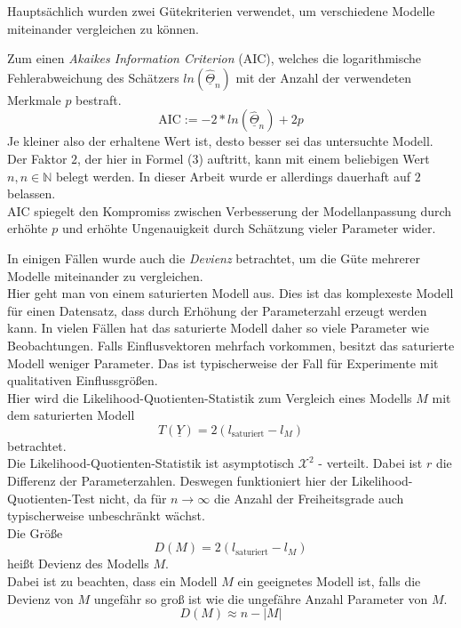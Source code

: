 \noindent
Haupts\"achlich wurden zwei G\"utekriterien verwendet, um verschiedene Modelle miteinander vergleichen zu k\"onnen.
\par\smallskip
Zum einen \textit{Akaikes Information Criterion} (AIC), welches die logarithmische Fehlerabweichung des Sch\"atzers $ln(\underline{\hat{\Theta}}_n)$ mit der Anzahl der verwendeten Merkmale $p$ bestraft. \\
\begin{equation}
\text{AIC} := -2*ln(\underline{\hat{\Theta}}_n) + 2p
\label{eq:aic}
\end{equation}  
Je kleiner also der erhaltene Wert ist, desto besser sei das untersuchte Modell. \\
Der Faktor $2$, der hier in Formel (3) auftritt, kann mit einem beliebigen Wert $n, n\in \mathds{N}$ belegt werden. In dieser Arbeit wurde er allerdings dauerhaft auf $2$ belassen. \\ 
AIC spiegelt den Kompromiss zwischen Verbesserung der Modellanpassung durch erh\"ohte $p$ und erh\"ohte Ungenauigkeit durch Sch\"atzung vieler Parameter wider.
\par\smallskip
In einigen F\"allen wurde auch die \textit{Devienz} betrachtet, um die G\"ute mehrerer Modelle miteinander zu vergleichen. \\
Hier geht man von einem saturierten Modell aus. Dies ist das komplexeste Modell f\"ur einen Datensatz, dass durch Erh\"ohung der Parameterzahl erzeugt werden kann. In vielen F\"allen hat das saturierte Modell daher so viele Parameter wie Beobachtungen. Falls Einflusvektoren mehrfach vorkommen, besitzt das saturierte Modell weniger Parameter. Das ist typischerweise der Fall f\"ur Experimente mit qualitativen Einflussgr\"o\ss{}en. \\
Hier wird die Likelihood-Quotienten-Statistik zum Vergleich eines Modells $M$ mit dem saturierten Modell 
\begin{equation}
T(\underline{Y}) = 2(l_{\text{saturiert}} - l_M)
\end{equation}
betrachtet. \\
Die Likelihood-Quotienten-Statistik ist asymptotisch  $\mathcal{X}^2$ - verteilt. Dabei ist $r$ die Differenz der Parameterzahlen. Deswegen funktioniert hier der Likelihood-Quotienten-Test nicht, da f\"ur $n \rightarrow \infty$ die Anzahl der Freiheitsgrade auch typischerweise unbeschr\"ankt w\"achst. \\
Die Gr\"o\ss{}e 
\begin{equation}
D(M) = 2(l_{\text{saturiert}} - l_M)
\end{equation}
hei\ss{}t Devienz des Modells $M$. \\
Dabei ist zu beachten, dass ein Modell $M$ ein geeignetes Modell ist, falls die Devienz von $M$ ungef\"ahr so gro\ss{} ist wie die ungef\"ahre Anzahl Parameter von $M$. \\
\begin{equation}
D(M) \approx n - |M|
\end{equation}
\par\medskip


